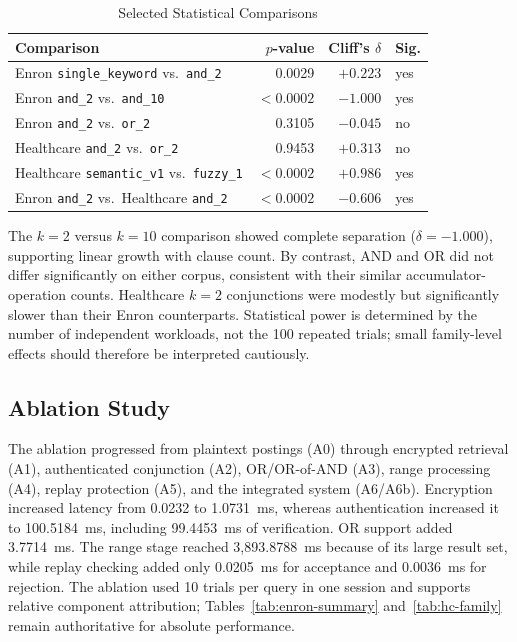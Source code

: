 \documentclass[journal]{IEEEtran}
\theoremstyle{tight}
\theoremstyle{remark}
\theoremstyle{plain}
\begin{document}
\begin{table}[!tb]
\centering
\caption{Selected Statistical Comparisons}
\label{tab:sig}
\scriptsize
\setlength{\tabcolsep}{3pt}
\begin{tabular}{p{2.9cm}rrl}
\toprule
\textbf{Comparison} & \textbf{\(p\)-value} &
\textbf{Cliff's \(\delta\)} & \textbf{Sig.} \\
\midrule
Enron \texttt{single\_keyword} vs.\ \texttt{and\_2}
& 0.0029 & \(+0.223\) & yes \\

Enron \texttt{and\_2} vs.\ \texttt{and\_10}
& \(<0.0002\) & \(-1.000\) & yes \\

Enron \texttt{and\_2} vs.\ \texttt{or\_2}
& 0.3105 & \(-0.045\) & no \\

Healthcare \texttt{and\_2} vs.\ \texttt{or\_2}
& 0.9453 & \(+0.313\) & no \\

Healthcare \texttt{semantic\_v1} vs.\ \texttt{fuzzy\_1}
& \(<0.0002\) & \(+0.986\) & yes \\

Enron \texttt{and\_2} vs.\ Healthcare \texttt{and\_2}
& \(<0.0002\) & \(-0.606\) & yes \\
\bottomrule
\end{tabular}
\end{table}

The \(k=2\) versus \(k=10\) comparison showed complete separation (\(\delta=-1.000\)), supporting linear growth with clause count. By contrast, AND and OR did not differ significantly on either corpus, consistent with their similar accumulator-operation counts. Healthcare \(k=2\) conjunctions were modestly but significantly slower than their Enron counterparts. Statistical power is determined by the number of independent workloads, not the 100 repeated trials; small family-level effects should therefore be interpreted cautiously.

\subsection{Ablation Study}
\label{4J}

The ablation progressed from plaintext postings (A0) through encrypted retrieval (A1), authenticated conjunction (A2), OR/OR-of-AND (A3), range processing (A4), replay protection (A5), and the integrated system (A6/A6b). Encryption increased latency from 0.0232 to 1.0731~ms, whereas authentication increased it to 100.5184~ms, including 99.4453~ms of verification. OR support added 3.7714~ms. The range stage reached 3{,}893.8788~ms because of its large result set, while replay checking added only 0.0205~ms for acceptance and 0.0036~ms for rejection. The ablation used 10 trials per query in one session and supports relative component attribution; Tables~\ref{tab:enron-summary} and~\ref{tab:hc-family} remain authoritative for absolute performance.
\end{document}

